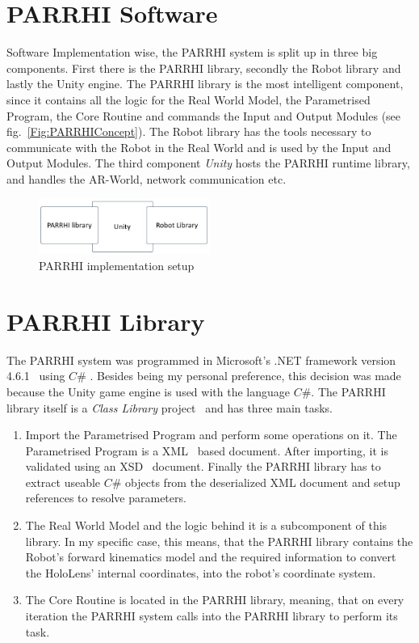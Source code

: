 \section{PARRHI Software}\label{Section:PARRHIHardware}
Software Implementation wise, the PARRHI system is split up in three big components. First there is the PARRHI library, secondly the Robot library and lastly the Unity engine. The PARRHI library is the most intelligent component, since it contains all the logic for the Real World Model, the Parametrised Program, the Core Routine and commands the Input and Output Modules (see fig.~\ref{Fig:PARRHIConcept}). The Robot library has the tools necessary to communicate with the Robot in the Real World and is used by the Input and Output Modules. The third component \textit{Unity} hosts the PARRHI runtime library, and handles the AR-World, network communication etc.


\begin{figure}[!h]
	\centering
	\includegraphics[width=0.5\textwidth]{Figures/Implementation_SystemSetup.jpg}
	\caption{PARRHI implementation setup}
	\label{Fig:Implementation}
\end{figure}


\section{PARRHI Library}
The PARRHI system was programmed in Microsoft's .NET framework version 4.6.1~\cite{NETFramework} using $C\#$ \cite{CSharp}. Besides being my personal preference, this decision was made because the Unity game engine is used with the language $C\#$. The PARRHI library itself is a \textit{Class Library} project~\cite{ClassLibrary} and has three main tasks.

\begin{enumerate}
	\item Import the Parametrised Program and perform some operations on it. The Parametrised Program is a XML~\cite{xmlW3C} based document. After importing, it is validated using an XSD~\cite{xsdW3C} document. Finally the PARRHI library has to extract useable $C\#$ objects from the deserialized XML document and setup references to resolve parameters.
	\item The Real World Model and the logic behind it is a subcomponent of this library. In my specific case, this means, that the PARRHI library contains the Robot's forward kinematics model and the required information to convert the HoloLens' internal coordinates, into the robot's coordinate system.
	\item The Core Routine is located in the PARRHI library, meaning, that on every iteration the PARRHI system calls into the PARRHI library to perform its task.
\end{enumerate}

